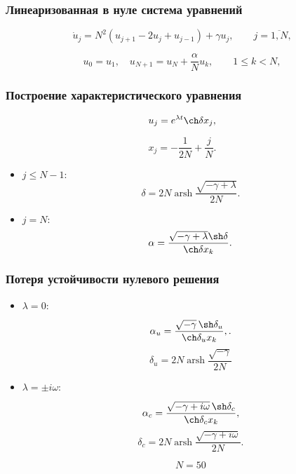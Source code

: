 \documentclass[fullscreen=true, unicode, bookmarks=false]{beamer}
\DeclareMathOperator{\arsh}{arsh}
\begin{document}
\begin{frame}
\frametitle{ Линеаризованная в нуле система уравнений }
 
\begin{equation}
	\dot{u}_j =  N^2(u_{j+1} - 2u_j + u_{j-1}) + \gamma u_j, \qquad j = \overline{1, N},
\end{equation}

\bigskip

\begin{equation}
	u_0 = u_1, \quad u_{N+1} = u_N + \dfrac{\alpha}{N}u_k, \qquad 1 \leqslant k < N,
\end{equation}

\end{frame}

\begin{frame}
\frametitle{ Построение характеристического уравнения }
 
$$ u_j = e^{\lambda t} \ch \delta x_j, $$

$$ x_j = -\dfrac{1}{2N} + \dfrac{j}{N}. $$

\bigskip

\begin{itemize}

\item { $ j \leqslant N-1: $ 
}
\begin{equation}
\delta = 2N \arsh \dfrac{\sqrt{-\gamma+\lambda}}{2N}.
\end{equation}
\medskip
\item { $ j = N: $ 
}
\begin{equation}
\alpha = \dfrac{\sqrt{-\gamma+\lambda}\sh\delta}{\ch\delta x_k}.
\end{equation}

\end{itemize}

\end{frame}

\begin{frame}
\frametitle{ Потеря устойчивости нулевого решения }

\begin{itemize}

\item { $ \lambda = 0: $ 
}

\begin{equation}
\alpha_u = \frac{ \sqrt{-\gamma} \, \sh \delta_u }{ \ch\delta_u x_k },.
\end{equation}
$$ \delta_u = 2N \arsh \dfrac{\sqrt{-\gamma}}{2N} $$

\medskip

\item { $ \lambda = \pm i \omega: \; $ 
}

\begin{equation}
\alpha_c = \frac{ \sqrt{-\gamma + i \omega} \, \sh \delta_c }{ \ch\delta_c x_k }, 
\end{equation}
$$ \delta_c = 2N \arsh \dfrac{\sqrt{-\gamma + i \omega}}{2N}. $$

\bigskip

$$ N=50 $$

\end{itemize}

\end{frame}
\end{document}
